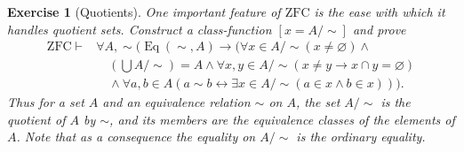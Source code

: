 \documentclass{scrartcl}
\theoremstyle{definition}
\theoremstyle{plain}
\theoremstyle{remark}
\newcommand{\ZFC}{\ensuremath{\mathrm{ZFC}}}
\newcommand{\limp}{\rightarrow}
\newcommand{\liff}{\leftrightarrow}
\newcommand{\quot}[2]{#1/\!\!#2}
\DeclareMathOperator{\Eq}{Eq}
\theoremstyle{plain}
\newtheorem{Exc}{Exercise}
\begin{document}
\begin{Exc}[Quotients\label{exc:quotients}]
  One important feature of $\ZFC$ is the ease with which it handles quotient sets. Construct a class-function $[x = \quot{A}{\sim}]$ and prove
  \begin{align*}
    \ZFC \vdash &\forall A, \sim (\Eq(\sim,A) \limp (\forall x \in \quot{A}{\sim} (x \not= \varnothing) \land\\
                &\quad \left(\bigcup \quot{A}{\sim}\right) = A \land \forall x,y \in \quot{A}{\sim} (x \not= y \limp x \cap y = \varnothing)\\
                &\quad \land \forall a,b \in A (a \sim b \liff \exists x \in \quot{A}{\sim} (a \in x \land b \in x)))\mbox{.}
  \end{align*}
  Thus for a set $A$ and an equivalence relation $\sim$ on $A$, the set $\quot{A}{\sim}$ is the quotient of $A$ by $\sim$, and its members are the equivalence classes of the elements of $A$. Note that as a consequence the equality on $\quot{A}{\sim}$ is the ordinary equality.
\end{Exc}
\end{document}
